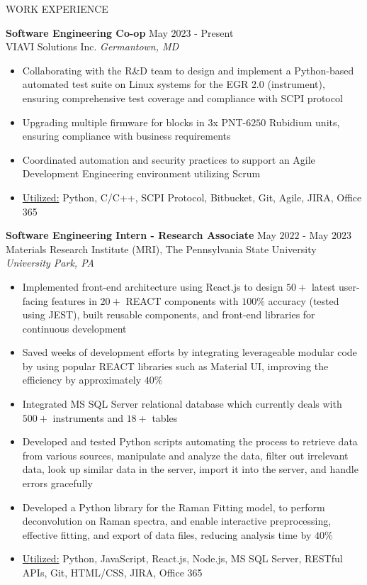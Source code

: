 \documentclass{resume} %
\begin{document}
\begin{rSection}{WORK EXPERIENCE}

\textbf{Software Engineering Co-op} \hfill May $2023$ - Present\\
VIAVI Solutions Inc. \hfill \textit{Germantown, MD}
 \begin{itemize}[itemsep = -4pt]
     \item Collaborating with the R\&D team to design and implement a Python-based automated test suite on Linux systems for the EGR $2.0$ (instrument), ensuring comprehensive test coverage and compliance with SCPI protocol
     \item Upgrading multiple firmware for blocks in $3$x PNT-$6250$ Rubidium units, ensuring compliance with business requirements
     \item Coordinated automation and security practices to support an Agile Development Engineering environment utilizing Scrum
     \item \underline{Utilized:} Python, C/C++, SCPI Protocol, Bitbucket, Git, Agile, JIRA, Office 365
    \end{itemize}

\textbf{Software Engineering Intern - Research Associate} \hfill May $2022$ - May $2023$\\
Materials Research Institute (MRI), The Pennsylvania State University \hfill \textit{University Park, PA}
 \begin{itemize}[itemsep = -4pt]
     \item Implemented front-end architecture using React.js to design $50+$ latest user-facing features in $20+$ REACT components with $100\%$ accuracy (tested using JEST), built reusable components, and front-end libraries for continuous development
     \item Saved weeks of development efforts by integrating leverageable modular code by using popular REACT libraries such as Material UI, improving the efficiency by approximately $40\%$
     \item Integrated MS SQL Server relational database which currently deals with $500+$ instruments and $18+$ tables
     \item Developed and tested Python scripts automating the process to retrieve data from various sources, manipulate and analyze the data, filter out irrelevant data, look up similar data in the server, import it into the server, and handle errors gracefully
     \item Developed a Python library for the Raman Fitting model, to perform deconvolution on Raman spectra, and enable interactive preprocessing, effective fitting, and export of data files, reducing analysis time by $40\%$
     \item \underline{Utilized:} Python, JavaScript, React.js, Node.js, MS SQL Server, RESTful APIs, Git, HTML/CSS, JIRA, Office 365
    \end{itemize}

\end{rSection} 
\end{document}
